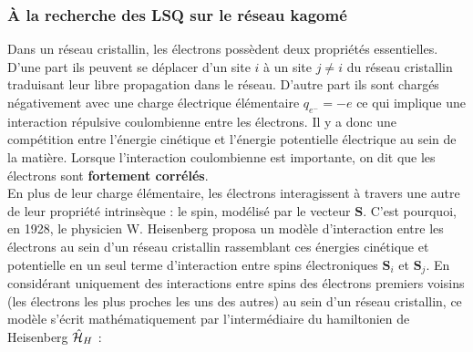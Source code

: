\subsubsection{\`{A} la recherche des LSQ sur le réseau kagomé}
\label{Frustration}
Dans un réseau cristallin, les électrons possèdent deux propriétés essentielles. D'une part ils peuvent se déplacer d'un site $i$ à un site $j\neq i$ du réseau cristallin traduisant leur libre propagation dans le réseau. D'autre part ils sont chargés négativement avec une charge électrique élémentaire $q_{e^-}=-e$ ce qui implique une interaction répulsive coulombienne entre les électrons. Il y a donc une compétition entre l'énergie cinétique et l'énergie potentielle électrique au sein de la matière. Lorsque l'interaction coulombienne est importante, on dit que les électrons sont \textbf{fortement corrélés}.\\ %
En plus de leur charge élémentaire, les électrons interagissent à travers une autre de leur propriété intrinsèque : le spin, modélisé par le vecteur $\mathbf{S}$. C'est pourquoi, en 1928, le physicien W. Heisenberg proposa un modèle d'interaction entre les électrons au sein d'un réseau cristallin rassemblant ces énergies cinétique et potentielle en un seul terme d'interaction entre spins électroniques $\mathbf{S}_i$ et $\mathbf{S}_j$. En considérant uniquement des interactions entre spins des électrons premiers voisins (les électrons les plus proches les uns des autres) au sein d'un réseau cristallin, ce modèle s'écrit mathématiquement par l'intermédiaire du hamiltonien de Heisenberg $\hat{\mathcal{H}}_H$ :
